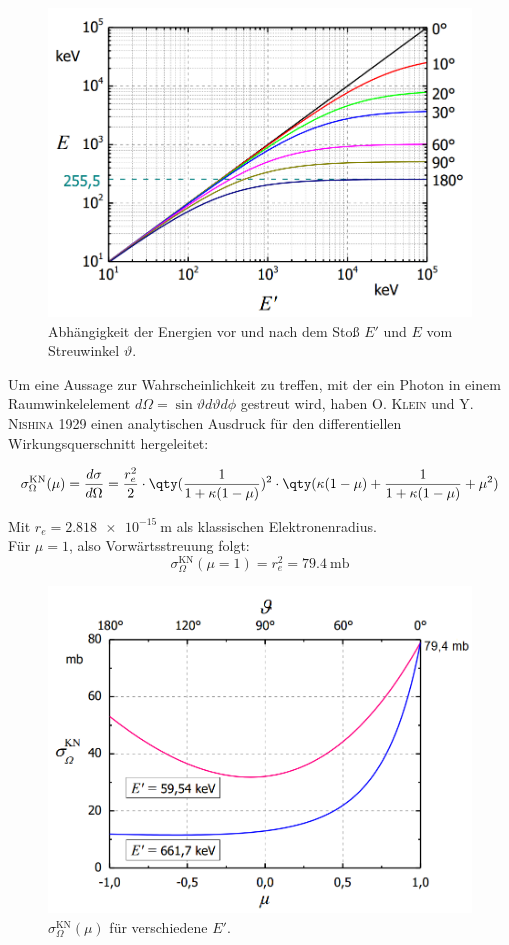 \documentclass[draft, slug=CS, room=Andreas-Schubert-Bau\,\ Labor\ 406,
supervisor=Juliane\ Volkmer, coursedate=29.\ 11.\ 2019]{../../Lab_Report_LaTeX/lab_report}
\begin{document}
\begin{figure}[H]\centering
        \includegraphics[width=.5\columnwidth]{./pictures/evontheta.png}
        \caption{Abhängigkeit der Energien vor und nach dem Stoß \(E'\) und \(E\) vom Streuwinkel
        \(\vartheta\).}
        \label{fig:evontheta}
\end{figure}

Um eine Aussage zur Wahrscheinlichkeit zu treffen, mit der ein Photon in einem Raumwinkelelement
\(d\Omega = \sin\vartheta d\vartheta d\phi\) gestreut wird, haben \textsc{O. Klein} und
\textsc{Y. Nishina} 1929 einen analytischen Ausdruck für den differentiellen Wirkungsquerschnitt
hergeleitet:

\begin{equation}\label{eq:kn}
        \sigma^{\text{KN}}_\Omega(\mu) = \frac{d\sigma}{d\Omega} = \frac{r_e^2}{2} \cdot \qty(\frac{1}{1 + \kappa(1 - \mu)})^2 \cdot \qty(\kappa(1 - \mu) + \frac{1}{1 + \kappa(1 - \mu)} + \mu^2)
\end{equation}

Mit \(r_e = \SI{2,818e-15}{\metre}\) als klassischen Elektronenradius.\\

Für \(\mu = 1\), also Vorwärtsstreuung folgt:
\begin{equation}\label{key}
        \sigma^{\text{KN}}_\Omega(\mu = 1) = r_e^2 = \SI{79,4}{\milli\barn}
\end{equation}

\begin{figure}[H]\centering
        \includegraphics[width=.5\columnwidth]{./pictures/sigma_kn.png}
        \caption{\(\sigma^{\text{KN}}_\Omega(\mu)\) für verschiedene \(E'\).}
        \label{fig:sigmakn}
\end{figure}
\end{document}
